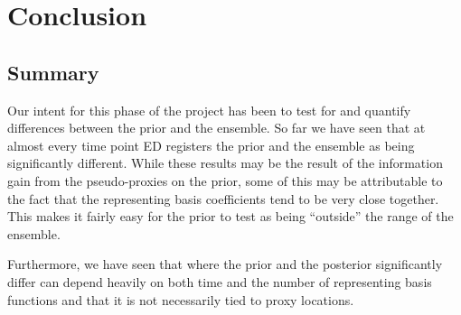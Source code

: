 \documentclass[12pt]{article}
\begin{document}
\begin{figure}[H]
  \hspace{-2.5cm} 
  
\end{figure}


\section{Conclusion}

\subsection{Summary}
Our intent for this phase of the project has been to test for and quantify differences between the prior and the ensemble. So far we have seen that at almost every time point ED registers the prior and the ensemble as being significantly different. While these results may be the result of the information gain from the pseudo-proxies on the prior, some of this may be attributable to the fact that the representing basis coefficients tend to be very close together. This makes it fairly easy for the prior to test as being ``outside'' the range of the ensemble.

Furthermore, we have seen that where the prior and the posterior significantly differ can depend heavily on both time and the number of representing basis functions and that it is not necessarily tied to proxy locations.
\end{document}
